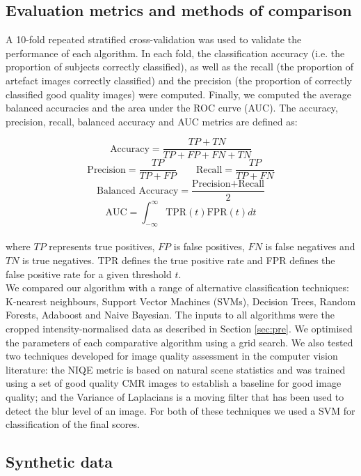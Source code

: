 \documentclass[preprint,12pt,authoryear]{elsarticle}
\begin{document}
\subsection{Evaluation metrics and methods of comparison}
\label{sec:error_measures}
A 10-fold repeated stratified cross-validation was used to validate the performance of each algorithm. In each fold, the classification accuracy (i.e. the proportion of subjects correctly classified), as well as the recall (the proportion of artefact images correctly classified) and the precision (the proportion of correctly classified good quality images) were computed. Finally, we computed the average balanced accuracies and the area under the ROC curve (AUC).
The accuracy, precision, recall, balanced accuracy and AUC metrics are defined as:

$$\text{Accuracy}= \dfrac{TP+TN}{TP+FP+FN+TN}$$
$$\text{Precision}= \dfrac{TP}{TP+FP} \quad  \quad  \text{Recall}= \dfrac{TP}{TP+FN}$$
$$\text{Balanced Accuracy}= \dfrac{\text{Precision+Recall}}{2}$$
$$\text{AUC}= \int_{-\infty }^{\infty } \text{TPR}(t) \text{FPR}(t) dt$$ \\

where $TP$ represents true positives, $FP$ is false positives, $FN$ is false negatives and $TN$ is true negatives. TPR defines the true positive rate and FPR defines the false positive rate for a given threshold $t$.\\

We compared our algorithm with a range of alternative classification techniques: K-nearest neighbours, Support Vector Machines (SVMs), Decision Trees, Random Forests, Adaboost  and  Naive Bayesian. The inputs to all algorithms were the cropped intensity-normalised data as described in Section \ref{sec:pre}. We optimised the parameters of each comparative algorithm using a grid search. We also tested two techniques developed for image quality assessment in the computer vision literature: the NIQE metric \citep{Mittal2013} is based on natural scene statistics and was trained using a set of good quality CMR images to establish a baseline for good image quality; and the Variance of Laplacians is a moving filter that has been used to detect the blur level of an image. For both of these techniques we used a SVM for classification of the final scores.

\subsection{Synthetic data}
\label{sec:SyntheticResults}
\end{document}
